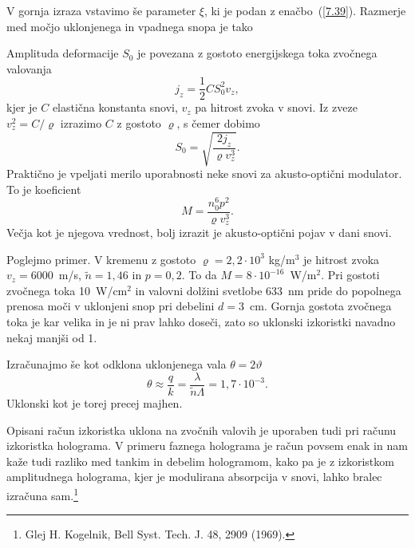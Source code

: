 V gornja izraza vstavimo še parameter $\xi$, ki je podan z enačbo~(\ref{7.39}).
Razmerje med močjo uklonjenega in vpadnega snopa je tako

Amplituda deformacije $S_0$ je povezana z gostoto energijskega toka
zvočnega valovanja 
\begin{equation}
j_{z}=\frac{1}{2}CS_{0}^{2}v_{z},
\label{7.49}
\end{equation}
kjer je $C$ elastična konstanta snovi, $v_z$ pa hitrost zvoka v snovi. 
Iz zveze $v_{z}^{2}=C/\varrho$ izrazimo $C$ z gostoto $\varrho$, s čemer dobimo 
\begin{equation}
S_{0}=\sqrt{\frac{2j_{z}}{\varrho v_{z}^{3}}}.
\label{7.50}
\end{equation}
Praktično je vpeljati merilo uporabnosti neke snovi za akusto-optični modulator. To je koeficient 
\begin{equation}
M=\frac{n_{0}^{6}p^{2}}{\varrho v_{z}^{3}}.
\label{7.51}
\end{equation}
Večja kot je njegova vrednost, bolj izrazit je akusto-optični pojav v dani snovi. 

Poglejmo primer. V kremenu z gostoto $\varrho=2,2\cdot10^{3}$ kg/m$^{3}$ je hitrost zvoka $v_{z}=6000$~m/s,
$\tilde{n}=1,46$ in $p=0,2$. To da $M=8\cdot10^{-16}$~W/m$^{2}$.
Pri gostoti zvočnega toka 10~W/cm$^{2}$ in valovni dolžini svetlobe 633~nm
pride do popolnega prenosa moči v uklonjeni snop pri debelini $d=3$~cm. Gornja gostota
zvočnega toka je kar velika in je ni prav lahko doseči, zato so 
uklonski izkoristki navadno nekaj manjši od 1.

Izračunajmo še kot odklona uklonjenega vala $\theta = 2 \vartheta$  
\begin{equation}
\theta \approx \frac{q}{k}=\frac{\lambda}{\tilde{n}\Lambda}=1,7\cdot10^{-3}.
\label{7.52}
\end{equation}
Uklonski kot je torej precej majhen.

\begin{remark}
Opisani račun izkoristka uklona na zvočnih valovih je uporaben tudi
pri računu izkoristka holograma. V primeru faznega holograma je račun
povsem enak in nam kaže tudi razliko med tankim in debelim hologramom,
kako pa je z izkoristkom amplitudnega holograma, kjer je modulirana
absorpcija v snovi, lahko bralec izračuna sam.\footnote{Glej H. Kogelnik, Bell Syst. Tech. J.
48, 2909 (1969).}
\end{remark}

